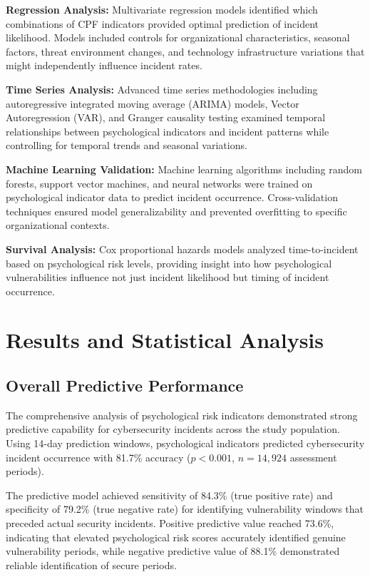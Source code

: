 \documentclass[10pt, twocolumn]{article}
\begin{document}
\textbf{Regression Analysis:} Multivariate regression models identified which combinations of CPF indicators provided optimal prediction of incident likelihood. Models included controls for organizational characteristics, seasonal factors, threat environment changes, and technology infrastructure variations that might independently influence incident rates.

\textbf{Time Series Analysis:} Advanced time series methodologies including autoregressive integrated moving average (ARIMA) models, Vector Autoregression (VAR), and Granger causality testing examined temporal relationships between psychological indicators and incident patterns while controlling for temporal trends and seasonal variations.

\textbf{Machine Learning Validation:} Machine learning algorithms including random forests, support vector machines, and neural networks were trained on psychological indicator data to predict incident occurrence. Cross-validation techniques ensured model generalizability and prevented overfitting to specific organizational contexts.

\textbf{Survival Analysis:} Cox proportional hazards models analyzed time-to-incident based on psychological risk levels, providing insight into how psychological vulnerabilities influence not just incident likelihood but timing of incident occurrence.

\section{Results and Statistical Analysis}

\subsection{Overall Predictive Performance}

The comprehensive analysis of psychological risk indicators demonstrated strong predictive capability for cybersecurity incidents across the study population. Using 14-day prediction windows, psychological indicators predicted cybersecurity incident occurrence with 81.7\% accuracy ($p < 0.001$, $n = 14,924$ assessment periods).

The predictive model achieved sensitivity of 84.3\% (true positive rate) and specificity of 79.2\% (true negative rate) for identifying vulnerability windows that preceded actual security incidents. Positive predictive value reached 73.6\%, indicating that elevated psychological risk scores accurately identified genuine vulnerability periods, while negative predictive value of 88.1\% demonstrated reliable identification of secure periods.
\end{document}
